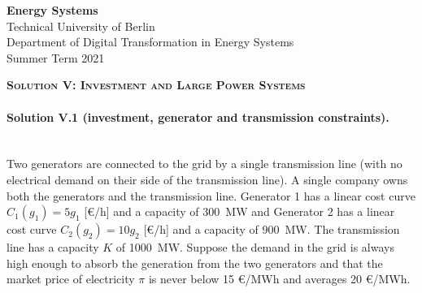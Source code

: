 \documentclass[11pt,a4paper,fleqn]{scrartcl}
\begin{document}
\begin{flushright}
  \textbf{Energy Systems}\\
  {\small Technical University of Berlin}\\
  {\small Department of Digital Transformation in Energy Systems}\\
  {\small Summer Term 2021}\\
 \end{flushright}
 
  
  \vspace{-0.5em}
  \hrulefill
  \vspace{0.3em}
 
 \begin{center}
  \textbf{\textsc{\Large Solution V: Investment and Large Power Systems}}\\[2.5em]
 \end{center}
 
 \vspace{-0.5em}
 \hrulefill
 \vspace{0.8em}

\paragraph{Solution V.1 \normalsize (investment, generator and transmission constraints).}~\\

Two generators are connected to the grid by a single transmission
line (with no electrical demand on their side of the transmission line). A single company owns both the generators and the transmission line. Generator 1 has a linear cost curve $C_1(g_1) = 5 g_1$ [\euro/h] and a capacity of 300~MW and Generator 2 has a linear cost curve $C_2(g_2) = 10 g_2$ [\euro/h] and a capacity of 900~MW. The transmission line has a capacity $K$ of 1000~MW. Suppose the demand in the grid is always high enough to absorb the
generation from the two generators and that the market price of
electricity $\pi$ is never below 15 \euro/MWh and averages 20
\euro/MWh.
\end{document}
